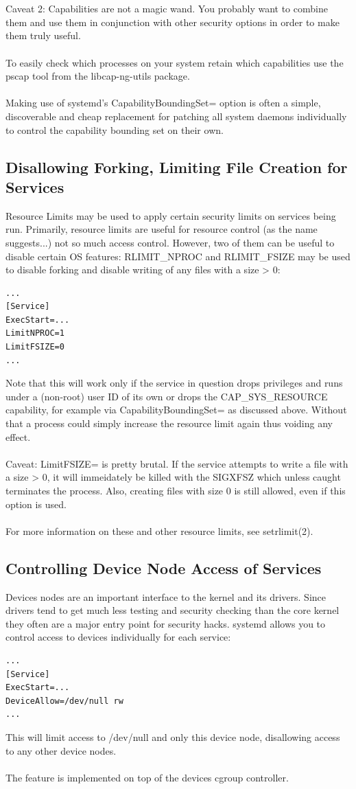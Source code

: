 \documentclass[titlepage]{article}
\begin{document}
\\
\\
Caveat 2: Capabilities are not a magic wand. You probably want to combine them and use them in conjunction with other security options in order to make them truly useful.
\\
\\
To easily check which processes on your system retain which capabilities use the pscap tool from the libcap-ng-utils package.
\\
\\
Making use of systemd's CapabilityBoundingSet= option is often a simple, discoverable and cheap replacement for patching all system daemons individually to control the capability bounding set on their own.
\subsection{Disallowing Forking, Limiting File Creation for Services}
Resource Limits may be used to apply certain security limits on services being run. Primarily, resource limits are useful for resource control (as the name suggests...) not so much access control. However, two of them can be useful to disable certain OS features: RLIMIT\_NPROC and RLIMIT\_FSIZE may be used to disable forking and disable writing of any files with a size > 0:
\begin{lstlisting}
...
[Service]
ExecStart=...
LimitNPROC=1
LimitFSIZE=0
...
\end{lstlisting}
Note that this will work only if the service in question drops privileges and runs under a (non-root) user ID of its own or drops the CAP\_SYS\_RESOURCE capability, for example via CapabilityBoundingSet= as discussed above. Without that a process could simply increase the resource limit again thus voiding any effect.
\\
\\
Caveat: LimitFSIZE= is pretty brutal. If the service attempts to write a file with a size > 0, it will immeidately be killed with the SIGXFSZ which unless caught terminates the process. Also, creating files with size 0 is still allowed, even if this option is used.
\\
\\
For more information on these and other resource limits, see setrlimit(2).
\subsection{Controlling Device Node Access of Services}
Devices nodes are an important interface to the kernel and its drivers. Since drivers tend to get much less testing and security checking than the core kernel they often are a major entry point for security hacks. systemd allows you to control access to devices individually for each service:
\begin{lstlisting}
...
[Service]
ExecStart=...
DeviceAllow=/dev/null rw
...
\end{lstlisting}
This will limit access to /dev/null and only this device node, disallowing access to any other device nodes.
\\
\\
The feature is implemented on top of the devices cgroup controller.
\end{document}
